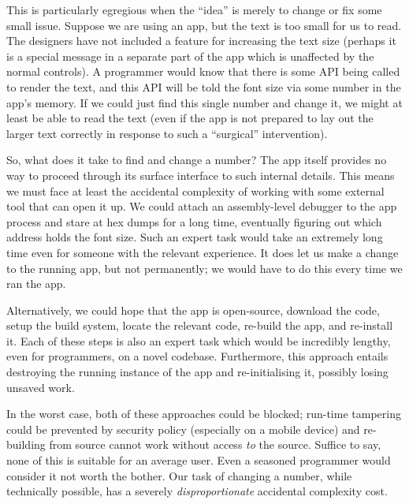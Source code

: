 This is particularly egregious when the ``idea'' is merely to change or
fix some small issue. Suppose we are using an app, but the text is too
small for us to read. The designers have not included a feature for
increasing the text size (perhaps it is a special message in a separate
part of the app which is unaffected by the normal controls). A
programmer would know that there is some API being called to render the
text, and this API will be told the font size via some number in the
app's memory. If we could just find this single number and change it, we
might at least be able to read the text (even if the app is not prepared
to lay out the larger text correctly in response to such a ``surgical''
intervention).

So, what does it take to find and change a number? The app itself
provides no way to proceed through its surface interface to such
internal details. This means we must face at least the accidental
complexity of working with some external tool that can open it up. We
could attach an assembly-level debugger to the app process and stare at
hex dumps for a long time, eventually figuring out which address holds
the font size. Such an expert task would take an extremely long time
even for someone with the relevant experience. It does let us make a
change to the running app, but not permanently; we would have to do this
every time we ran the app.

Alternatively, we could hope that the app is open-source, download the
code, setup the build system, locate the relevant code, re-build the
app, and re-install it. Each of these steps is also an expert task which
would be incredibly lengthy, even for programmers, on a novel codebase.
Furthermore, this approach entails destroying the running instance of
the app and re-initialising it, possibly losing unsaved work.

In the worst case, both of these approaches could be blocked; run-time
tampering could be prevented by security policy (especially on a mobile
device) and re-building from source cannot work without access \emph{to}
the source. Suffice to say, none of this is suitable for an average
user. Even a seasoned programmer would consider it not worth the bother.
Our task of changing a number, while technically possible, has a
severely \emph{disproportionate} accidental complexity cost.

